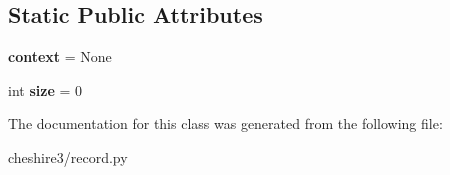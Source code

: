 \subsection*{Static Public Attributes}
\begin{DoxyCompactItemize}
\item 
\hypertarget{classcheshire3_1_1record_1_1_dom_record_ae72c67c7dac176dfdd6ad4b7d29551c7}{{\bfseries context} = None}\label{classcheshire3_1_1record_1_1_dom_record_ae72c67c7dac176dfdd6ad4b7d29551c7}

\item 
\hypertarget{classcheshire3_1_1record_1_1_dom_record_ac9442de77cdd98f1f0974babac51e03d}{int {\bfseries size} = 0}\label{classcheshire3_1_1record_1_1_dom_record_ac9442de77cdd98f1f0974babac51e03d}

\end{DoxyCompactItemize}


The documentation for this class was generated from the following file\-:\begin{DoxyCompactItemize}
\item 
cheshire3/record.\-py\end{DoxyCompactItemize}
